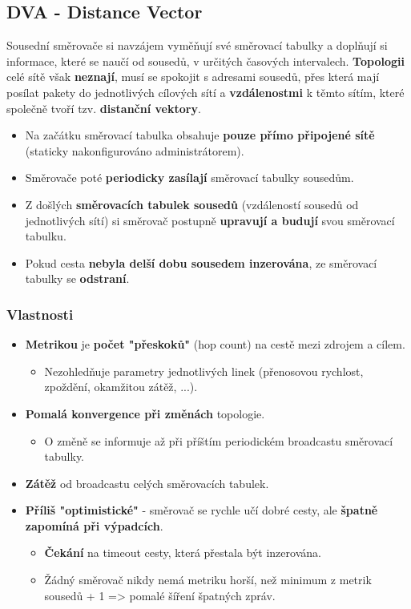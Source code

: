 \subsection*{DVA - Distance Vector}
Sousední směrovače si navzájem vyměňují své směrovací tabulky a doplňují si informace, které se naučí od sousedů, v určitých časových intervalech. \textbf{Topologii} celé sítě však \textbf{neznají}, musí se spokojit s adresami sousedů, přes která mají posílat pakety do jednotlivých cílových sítí a \textbf{vzdálenostmi} k těmto sítím, které společně tvoří tzv. \textbf{distanční vektory}.

\begin{itemize}
\item Na začátku směrovací tabulka obsahuje \textbf{pouze přímo připojené sítě} (staticky nakonfigurováno administrátorem).
\item Směrovače poté \textbf{periodicky zasílají }směrovací tabulky sousedům.
\item Z došlých \textbf{směrovacích tabulek sousedů} (vzdáleností sousedů od jednotlivých sítí) si směrovač postupně \textbf{upravují a budují} svou směrovací tabulku.
\item Pokud cesta \textbf{nebyla delší dobu sousedem inzerována}, ze směrovací tabulky se \textbf{odstraní}.
\end{itemize}

\subsubsection*{Vlastnosti}
\begin{itemize}
\item \textbf{Metrikou} je \textbf{počet "přeskoků"} (hop count) na cestě mezi zdrojem a cílem.
\begin{itemize}
\item Nezohledňuje parametry jednotlivých linek (přenosovou rychlost, zpoždění, okamžitou zátěž, ...).
\end{itemize}
\item \textbf{Pomalá konvergence při změnách} topologie.
\begin{itemize}
\item O změně se informuje až při příštím periodickém broadcastu směrovací tabulky.
\end{itemize}
\item \textbf{Zátěž }od broadcastu celých směrovacích tabulek.
\item \textbf{Příliš "optimistické"} - směrovač se rychle učí dobré cesty, ale \textbf{špatně zapomíná při výpadcích}.
\begin{itemize}
	\item \textbf{Čekání} na timeout cesty, která přestala být inzerována.
	\item Žádný směrovač nikdy nemá metriku horší, než minimum z metrik sousedů + 1 => pomalé šíření špatných zpráv.
\end{itemize}
\end{itemize}

